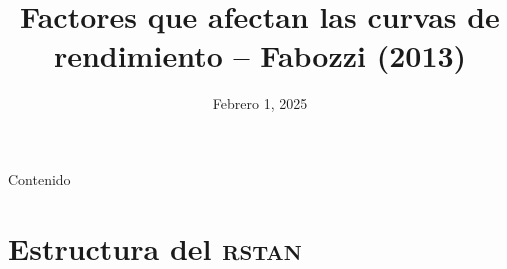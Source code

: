 \documentclass{beamer}
\title{Factores que afectan las curvas de rendimiento -- Fabozzi (2013)}
\author[]{}
\institute[]{\large\textbf{Universidad Nacional de Colombia}}
\date{Febrero 1, 2025}
\begin{document}
\frame{\titlepage}

\begin{frame}{Contenido}
\tableofcontents
\end{frame}

\section{Estructura del \textsc{rstan}}

\begin{frame}

\end{frame}
\begin{frame}

\end{frame}
\end{document}
